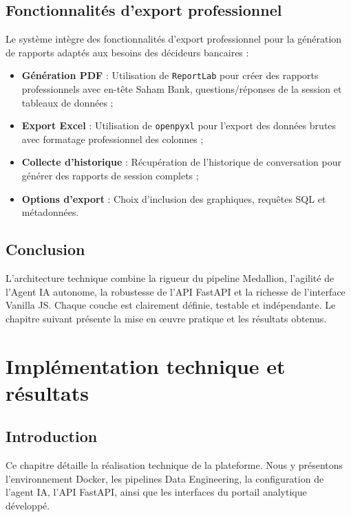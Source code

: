 \documentclass[a4paper,12pt]{report}
\begin{document}
\section{Fonctionnalités d'export professionnel}
\begin{doublespace}
Le système intègre des fonctionnalités d'export professionnel pour la génération de rapports adaptés aux besoins des décideurs bancaires :
\begin{itemize}
    \item \textbf{Génération PDF} : Utilisation de \texttt{ReportLab} pour créer des rapports professionnels avec en-tête Saham Bank, questions/réponses de la session et tableaux de données ;
    \item \textbf{Export Excel} : Utilisation de \texttt{openpyxl} pour l'export des données brutes avec formatage professionnel des colonnes ;
    \item \textbf{Collecte d'historique} : Récupération de l'historique de conversation pour générer des rapports de session complets ;
    \item \textbf{Options d'export} : Choix d'inclusion des graphiques, requêtes SQL et métadonnées.
\end{itemize}
\end{doublespace}

\section{Conclusion}
\begin{doublespace}
L'architecture technique combine la rigueur du pipeline Medallion, l'agilité de l'Agent IA autonome, la robustesse de l'API FastAPI et la richesse de l'interface Vanilla JS. Chaque couche est clairement définie, testable et indépendante. Le chapitre suivant présente la mise en œuvre pratique et les résultats obtenus.
\end{doublespace}

\newpage
\chapter{Implémentation technique et résultats}

\section*{Introduction}
\begin{doublespace}
Ce chapitre détaille la réalisation technique de la plateforme. Nous y présentons l'environnement Docker, les pipelines Data Engineering, la configuration de l'agent IA, l'API FastAPI, ainsi que les interfaces du portail analytique développé.
\end{doublespace}
\end{document}
